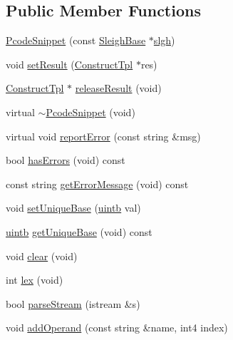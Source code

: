 \subsection*{Public Member Functions}
\begin{DoxyCompactItemize}
\item 
\mbox{\hyperlink{class_pcode_snippet_a7bec86c6f170c157b82c56cb8630a84b}{Pcode\+Snippet}} (const \mbox{\hyperlink{class_sleigh_base}{Sleigh\+Base}} $\ast$\mbox{\hyperlink{slgh__compile_8hh_a8e32dbdce421159d99df1fe374420718}{slgh}})
\item 
void \mbox{\hyperlink{class_pcode_snippet_a55276b8350568981fb7812b0e49a9ced}{set\+Result}} (\mbox{\hyperlink{class_construct_tpl}{Construct\+Tpl}} $\ast$res)
\item 
\mbox{\hyperlink{class_construct_tpl}{Construct\+Tpl}} $\ast$ \mbox{\hyperlink{class_pcode_snippet_a0d97b99a25f3702e6718d9e1c2f139b1}{release\+Result}} (void)
\item 
virtual \mbox{\hyperlink{class_pcode_snippet_a62637fd83338517b4d5899c1865c8247}{$\sim$\+Pcode\+Snippet}} (void)
\item 
virtual void \mbox{\hyperlink{class_pcode_snippet_ad9512a3125317bde59fc0de0b6f7d7ad}{report\+Error}} (const string \&msg)
\item 
bool \mbox{\hyperlink{class_pcode_snippet_a349148e16b340f5b0798ce3414b35e3c}{has\+Errors}} (void) const
\item 
const string \mbox{\hyperlink{class_pcode_snippet_a5527551fede6c9930d31e359d57c49aa}{get\+Error\+Message}} (void) const
\item 
void \mbox{\hyperlink{class_pcode_snippet_a017937876cfc1862f422d9b2f493cf9d}{set\+Unique\+Base}} (\mbox{\hyperlink{types_8h_a2db313c5d32a12b01d26ac9b3bca178f}{uintb}} val)
\item 
\mbox{\hyperlink{types_8h_a2db313c5d32a12b01d26ac9b3bca178f}{uintb}} \mbox{\hyperlink{class_pcode_snippet_a9a577f3c196fe540314d7f887af3befc}{get\+Unique\+Base}} (void) const
\item 
void \mbox{\hyperlink{class_pcode_snippet_a5b892587710fef5de90173cb73a055d8}{clear}} (void)
\item 
int \mbox{\hyperlink{class_pcode_snippet_a0a411eb7a56f99bda08f4df48f78d510}{lex}} (void)
\item 
bool \mbox{\hyperlink{class_pcode_snippet_afa88b6062d6e6fd89a2597be387d906d}{parse\+Stream}} (istream \&s)
\item 
void \mbox{\hyperlink{class_pcode_snippet_adeeb03f199547eaf4f749e21b6f8c1cd}{add\+Operand}} (const string \&name, int4 index)
\end{DoxyCompactItemize}
